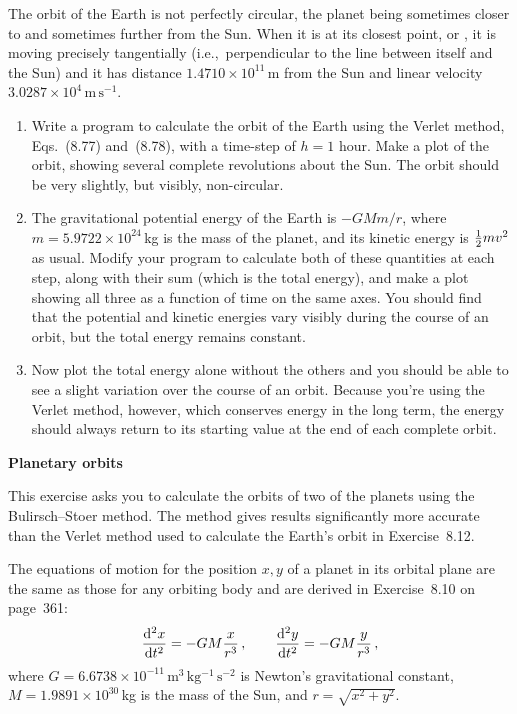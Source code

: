 \documentclass[12pt]{article}
\begin{document}
\begin{exercises}
The orbit of the Earth is not perfectly circular, the planet being
sometimes closer to and sometimes further from the Sun.  When it is at its
closest point, or , it is moving precisely tangentially
(i.e.,~perpendicular to the line between itself and the Sun) and it has
distance $1.4710\times10^{11}\,$m from the Sun and linear velocity
$3.0287\times10^4\,\mathrm{m\,s^{-1}}$.
\begin{enumerate}\setlength{\itemsep}{0pt}
\item Write a program to calculate the orbit of the Earth using the Verlet
  method, Eqs.~(8.77) and~(8.78), with a time-step of $h=1$ hour.  Make a
  plot of the orbit, showing several complete revolutions about the Sun.
  The orbit should be very slightly, but visibly, non-circular.
\item The gravitational potential energy of the Earth is $-GMm/r$, where
  $m=5.9722\times10^{24}\,$kg is the mass of the planet, and its kinetic
  energy is $\tfrac12 mv^2$ as usual.  Modify your program to calculate both
  of these quantities at each step, along with their sum (which is the
  total energy), and make a plot showing all three as a function of time on
  the same axes.  You should find that the potential and kinetic energies
  vary visibly during the course of an orbit, but the total energy remains
  constant.
\item Now plot the total energy alone without the others and you should be
  able to see a slight variation over the course of an orbit.  Because
  you're using the Verlet method, however, which conserves energy in the
  long term, the energy should always return to its starting value at the
  end of each complete orbit.
\end{enumerate}



\exercise \textbf{Planetary orbits}

\exskip This exercise asks you to calculate the orbits of two of the
planets using the Bulirsch--Stoer method.  The method gives results
significantly more accurate than the Verlet method used to calculate the
Earth's orbit in Exercise~8.12.

The equations of motion for the position $x,y$ of a planet in its orbital
plane are the same as those for any orbiting body and are derived in
Exercise~8.10 on page~361:
\begin{displaymath}
{\mathrm{d}^2 x\over\mathrm{d}t^2} = -GM {x\over r^3}\,, \qquad
{\mathrm{d}^2 y\over\mathrm{d}t^2} = -GM {y\over r^3}\,,
\end{displaymath}
where $G=6.6738\times10^{-11}\,\mathrm{m^3\,kg^{-1}\,s^{-2}}$ is Newton's
gravitational constant, $M=1.9891\times10^{30}\,$kg is the mass of the Sun,
and $r=\sqrt{x^2+y^2}$.


\end{exercises}
\end{document}
